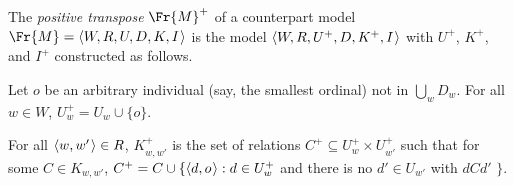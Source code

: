 \documentclass[11pt]{woarticle}
\newcommand{\cmnt}[1]{\iffalse #1 \fi}
\theoremstyle{break}
\theoremstyle{nonumberplain}
\newcommand{\1}{\;\,|\;\,}
\renewcommand{\t}[1]{\ensuremath{\langle #1  \makebox[.2ex]{}\rangle}}
\begin{document}
\begin{definition}{\label{!TRANSPOSE}}
  The \emph{positive transpose} $\Fr{M}^+$ of a counterpart model
  $\Fr{M} = \t{W,R,U,D,K,I}$ is the model $\t{W,R,U^+,D,K^+,I}$ with $U^+$,
  $K^+$, and $I^{+}$ constructed as follows.

  Let $o$ be an arbitrary individual (say, the smallest ordinal) not in
  $\bigcup_w D_w$. For all $w\in W$, $U^+_w = U_w \cup \{ o \}$.

  For all $\t{w,w'}\in R$, $K^+_{w,w'}$ is the set of relations
  $C^+ \subseteq U^+_w\times U^+_{w'}$ such that for some $C \in K_{w,w'}$,
  $C^+ = C \cup \{ \t{d,o} : d\in U^+_{w}$ and there is no $d'\in U_{w'}$ with
  $dCd'$ $\}$.%
  \cmnt{%
    (So in particular, $C^+$ contains $\t{o,o}$.)%
  } %
\end{definition}
\end{document}
